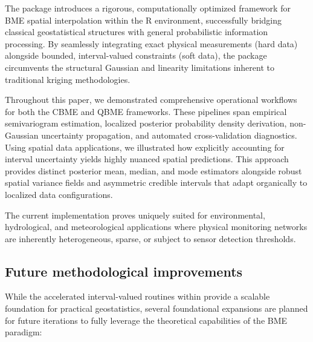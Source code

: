 The  package introduces a rigorous, computationally optimized framework for BME spatial interpolation within the R environment, successfully bridging classical geostatistical structures with general probabilistic information processing. By seamlessly integrating exact physical measurements (hard data) alongside bounded, interval-valued constraints (soft data), the package circumvents the structural Gaussian and linearity limitations inherent to traditional kriging methodologies.

Throughout this paper, we demonstrated comprehensive operational workflows for both the CBME and QBME frameworks. These pipelines span empirical semivariogram estimation, localized posterior probability density derivation, non-Gaussian uncertainty propagation, and automated cross-validation diagnostics. Using spatial data applications, we illustrated how explicitly accounting for interval uncertainty yields highly nuanced spatial predictions. This approach provides distinct posterior mean, median, and mode estimators alongside robust spatial variance fields and asymmetric credible intervals that adapt organically to localized data configurations.

The current implementation proves uniquely suited for environmental, hydrological, and meteorological applications where physical monitoring networks are inherently heterogeneous, sparse, or subject to sensor detection thresholds.

\subsection{Future methodological improvements}\label{future-methodological-improvements}

While the accelerated interval-valued routines within  provide a scalable foundation for practical geostatistics, several foundational expansions are planned for future iterations to fully leverage the theoretical capabilities of the BME paradigm:

